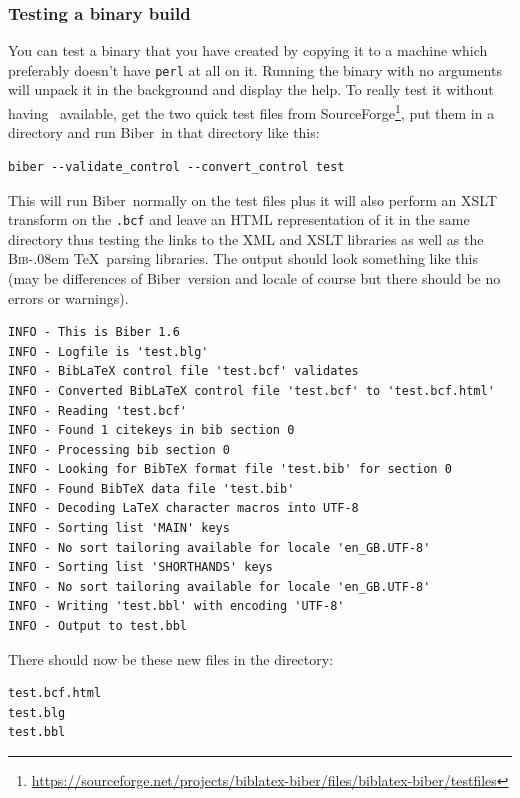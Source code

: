 \documentclass{ltxdockit}
\def\BibTeX{\textsc{Bib}\kern-.08em \TeX}
\newcommand*{\biber}{Biber\xspace}
\begin{document}
\subsubsection{Testing a binary build}
You can test a binary that you have created by copying it to a machine
which preferably doesn't have \verb+perl+ at all on it. Running the binary with no
arguments will unpack it in the background and display the help. To really
test it without having \latex\ available, get the two quick test files from
SourceForge\footnote{\url{https://sourceforge.net/projects/biblatex-biber/files/biblatex-biber/testfiles}},
put them in a directory and run \biber\ in that directory like this:

\begin{verbatim}
biber --validate_control --convert_control test
\end{verbatim}

\noindent This will run \biber\ normally on the test files plus it
will also perform an XSLT transform on the \verb+.bcf+ and
leave an HTML representation of it in the same directory thus testing the
links to the XML and XSLT libraries as well as the \BibTeX\ parsing
libraries. The output should look something like this (may be differences
of \biber\ version and locale of course but there should be no errors
or warnings).

\begin{verbatim}
INFO - This is Biber 1.6
INFO - Logfile is 'test.blg'
INFO - BibLaTeX control file 'test.bcf' validates
INFO - Converted BibLaTeX control file 'test.bcf' to 'test.bcf.html'
INFO - Reading 'test.bcf'
INFO - Found 1 citekeys in bib section 0
INFO - Processing bib section 0
INFO - Looking for BibTeX format file 'test.bib' for section 0
INFO - Found BibTeX data file 'test.bib'
INFO - Decoding LaTeX character macros into UTF-8
INFO - Sorting list 'MAIN' keys
INFO - No sort tailoring available for locale 'en_GB.UTF-8'
INFO - Sorting list 'SHORTHANDS' keys
INFO - No sort tailoring available for locale 'en_GB.UTF-8'
INFO - Writing 'test.bbl' with encoding 'UTF-8'
INFO - Output to test.bbl
\end{verbatim}

\noindent There should now be these new files in the directory:

\begin{verbatim}
test.bcf.html
test.blg
test.bbl
\end{verbatim}
\end{document}
